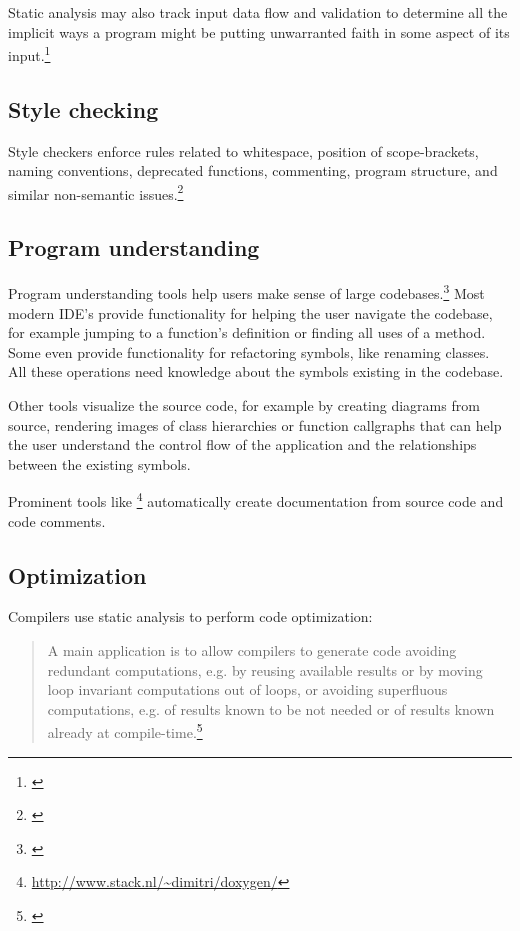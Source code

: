 Static analysis may also track input data flow and validation to determine
all the implicit ways a program might be putting unwarranted faith in some aspect of its input.\footnote{\citep[172]{SecureProgramming}}

\subsection{Style checking}

Style checkers enforce rules related to whitespace, position of scope-brackets, naming conventions, deprecated functions, commenting, program structure, and similar non-semantic issues.\footnote{\citep[25]{SecureProgramming}}


\subsection{Program understanding}

Program understanding tools help users make sense of large codebases.\footnote{\citep[27]{SecureProgramming}} Most modern IDE's provide functionality for helping the user navigate the codebase, for example jumping to a function's definition or finding all uses of a method. Some even provide functionality for refactoring symbols, like renaming classes. All these operations need knowledge about the symbols existing in the codebase.

Other tools visualize the source code, for example by creating  diagrams from source, rendering images of class hierarchies or function callgraphs that can help the user understand the control flow of the application and the relationships between the existing symbols.


Prominent tools like \footnote{\url{http://www.stack.nl/~dimitri/doxygen/}} automatically create documentation from source code and code comments.

\subsection{Optimization}

Compilers use static analysis to perform code optimization:

\begin{quotation}
A main application is to allow compilers to generate code avoiding redundant computations, e.g. by reusing available results or by moving loop invariant computations out of loops, or avoiding superfluous computations, e.g. of results known to be not needed or of results known already at compile-time.\footnote{\citep[1]{ProgramAnalysis}}
\end{quotation}

